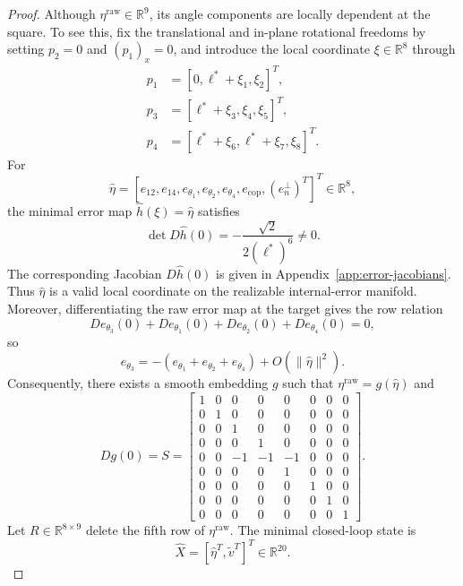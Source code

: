 \documentclass[letterpaper,journal]{IEEEtran}
\theoremstyle{plain}
\theoremstyle{definition}
\theoremstyle{remark}
\begin{document}
\begin{proof}
Although \(\eta^{\mathrm{raw}}\in\mathbb R^9\), its angle components are locally dependent at the square. To see this, fix the translational and in-plane rotational freedoms by setting \(p_2=0\) and \((p_1)_x=0\), and introduce the local coordinate \(\xi\in\mathbb R^8\) through
\[
\begin{aligned}
p_1&=[0,\ell^*+\xi_1,\xi_2]^T,\\
p_3&=[\ell^*+\xi_3,\xi_4,\xi_5]^T,\\
p_4&=[\ell^*+\xi_6,\ell^*+\xi_7,\xi_8]^T .
\end{aligned}
\]
For
\begin{equation}
\hat\eta=[e_{12},e_{14},e_{\theta_1},e_{\theta_2},e_{\theta_4},e_{\mathrm{cop}},(e_n^\perp)^T]^T\in\mathbb R^8,
\label{eq:hat-eta}
\end{equation}
the minimal error map \(\hat h(\xi)=\hat\eta\) satisfies
\[
\det D\hat h(0)=-\frac{\sqrt2}{2(\ell^*)^6}\neq0.
\]
The corresponding Jacobian \(D\hat h(0)\) is given in Appendix~\ref{app:error-jacobians}. Thus \(\hat\eta\) is a valid local coordinate on the realizable internal-error manifold. Moreover, differentiating the raw error map at the target gives the row relation
\[
D e_{\theta_3}(0)+D e_{\theta_1}(0)+D e_{\theta_2}(0)+D e_{\theta_4}(0)=0,
\]
so
\begin{equation}
e_{\theta_3}=-(e_{\theta_1}+e_{\theta_2}+e_{\theta_4})+O(\|\hat\eta\|^2).
\label{eq:angle-redundancy-linear}
\end{equation}
Consequently, there exists a smooth embedding \(g\) such that \(\eta^{\mathrm{raw}}=g(\hat\eta)\) and
\begin{equation}
Dg(0)=S=
\begin{bmatrix}
1&0&0&0&0&0&0&0\\
0&1&0&0&0&0&0&0\\
0&0&1&0&0&0&0&0\\
0&0&0&1&0&0&0&0\\
0&0&-1&-1&-1&0&0&0\\
0&0&0&0&1&0&0&0\\
0&0&0&0&0&1&0&0\\
0&0&0&0&0&0&1&0\\
0&0&0&0&0&0&0&1
\end{bmatrix}.
\label{eq:S-matrix}
\end{equation}
Let \(R\in\mathbb R^{8\times9}\) delete the fifth row of \(\eta^{\mathrm{raw}}\). The minimal closed-loop state is
\begin{equation}
\hat X=[\hat\eta^T,\tilde v^T]^T\in\mathbb R^{20}.
\label{eq:minimal-state}
\end{equation}

\end{proof}
\end{document}

